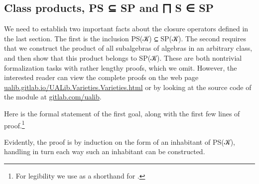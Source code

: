 \documentclass[a4paper,UKenglish,cleveref,autoref,thm-restate]{lipics-v2021}
\begin{document}
\subsection{Class products, PS ⊆ SP and ⨅ S ∈ SP}\label{ssec:class-products-and-inclusions}
We need to establish two important facts about the closure operators defined in the last section.  The first is the inclusion \ad P\ad S(\ab 𝒦) ⊆ \ad S\ad P(\ab 𝒦). The second requires that we construct the product of all subalgebras of algebras in an arbitrary class, and then show that this product belongs to \ad S\ad P(\ab 𝒦).  These are both nontrivial formalization tasks with rather lengthy proofs, which we omit.  However, the interested reader can view the complete proofs on the web page \href{https://ualib.gitlab.io/UALib.Varieties.Varieties.html}{ualib.gitlab.io/UALib.Varieties.Varieties.html} or by looking at the source code of the \ualibVarieties module at \href{https://gitlab.com/ualib/ualib.gitlab.io/-/blob/master/UALib/Varieties/Varieties.lagda}{gitlab.com/ualib}.

Here is the formal statement of the first goal, along with the first few lines of proof.\footnote{For legibility we use  as a shorthand for
   
   
   .}
\ccpad
\begin{code}%
  
\end{code}
\ccpad
Evidently, the proof is by induction on the form of an inhabitant of \ad P\ad S(\ab 𝒦), handling in turn each way such an inhabitant can be constructed. \seedocfordetails

\end{document}
